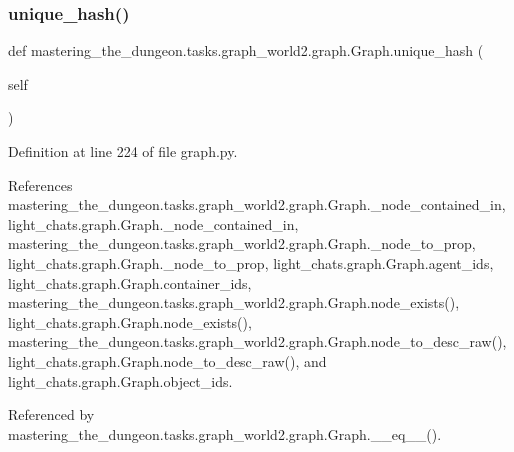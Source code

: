 \subsubsection{\texorpdfstring{unique\+\_\+hash()}{unique\_hash()}}
{\footnotesize\ttfamily def mastering\+\_\+the\+\_\+dungeon.\+tasks.\+graph\+\_\+world2.\+graph.\+Graph.\+unique\+\_\+hash (\begin{DoxyParamCaption}\item[{}]{self }\end{DoxyParamCaption})}



Definition at line 224 of file graph.\+py.



References mastering\+\_\+the\+\_\+dungeon.\+tasks.\+graph\+\_\+world2.\+graph.\+Graph.\+\_\+node\+\_\+contained\+\_\+in, light\+\_\+chats.\+graph.\+Graph.\+\_\+node\+\_\+contained\+\_\+in, mastering\+\_\+the\+\_\+dungeon.\+tasks.\+graph\+\_\+world2.\+graph.\+Graph.\+\_\+node\+\_\+to\+\_\+prop, light\+\_\+chats.\+graph.\+Graph.\+\_\+node\+\_\+to\+\_\+prop, light\+\_\+chats.\+graph.\+Graph.\+agent\+\_\+ids, light\+\_\+chats.\+graph.\+Graph.\+container\+\_\+ids, mastering\+\_\+the\+\_\+dungeon.\+tasks.\+graph\+\_\+world2.\+graph.\+Graph.\+node\+\_\+exists(), light\+\_\+chats.\+graph.\+Graph.\+node\+\_\+exists(), mastering\+\_\+the\+\_\+dungeon.\+tasks.\+graph\+\_\+world2.\+graph.\+Graph.\+node\+\_\+to\+\_\+desc\+\_\+raw(), light\+\_\+chats.\+graph.\+Graph.\+node\+\_\+to\+\_\+desc\+\_\+raw(), and light\+\_\+chats.\+graph.\+Graph.\+object\+\_\+ids.



Referenced by mastering\+\_\+the\+\_\+dungeon.\+tasks.\+graph\+\_\+world2.\+graph.\+Graph.\+\_\+\+\_\+eq\+\_\+\+\_\+().

